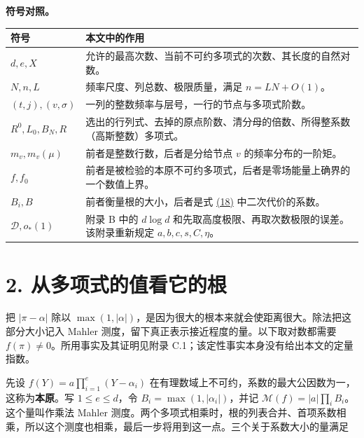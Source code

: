 \documentclass[11pt,a4paper]{article}
\newcounter{none}
\providecommand{\real}[1]{#1}
\begin{document}
\textbf{符号对照。}

{\def\LTcaptype{none} %
{\small
\begin{longtable}[]{@{}
  >{\raggedright\arraybackslash}p{(\linewidth - 2\tabcolsep) * \real{0.22}}
  >{\raggedright\arraybackslash}p{(\linewidth - 2\tabcolsep) * \real{0.78}}@{}}
\toprule\noalign{}
\begin{minipage}[b]{\linewidth}\raggedright
符号
\end{minipage} & \begin{minipage}[b]{\linewidth}\raggedright
本文中的作用
\end{minipage} \\
\midrule\noalign{}
\endhead
\bottomrule\noalign{}
\endlastfoot
\(d,e,X\) & 允许的最高次数、当前不可约多项式的次数、其长度的自然对数。 \\
\(N,n,L\) & 频率尺度、列总数、极限质量，满足 \(n=LN+O(1)\)。 \\
\((t,j),(v,\sigma)\) & 一列的整数频率与层号，一行的节点与多项式阶数。 \\
\(R^0,L_0,B_N,R\) & 选出的行列式、去掉的原点阶数、清分母的倍数、所得整系数（高斯整数）多项式。 \\
\(m_v,m_v(\mu)\) & 前者是整数行数，后者是分给节点 \(v\) 的频率分布的一阶矩。 \\
\(f,f_0\) & 前者是被检验的本原不可约多项式，后者是零场能量上确界的一个数值上界。 \\
\(B_i,B\) & 前者衡量根的大小，后者是式 \hyperref[eq:18]{(18)} 中二次代价的系数。 \\
\(\mathscr D,o_*(1)\) & 附录 B 中的 \(d\log d\) 和先取高度极限、再取次数极限的误差。该附录重新规定 \(a,b,c,s,C,\eta\)。 \\
\end{longtable}
}
}

\section{2. 从多项式的值看它的根}\label{ux4eceux591aux9879ux5f0fux7684ux503cux770bux5b83ux7684ux6839}

把 \(|\pi-\alpha|\) 除以 \(\max(1,|\alpha|)\)，是因为很大的根本来就会使距离很大。除法把这部分大小记入 Mahler 测度，留下真正表示接近程度的量。以下取对数都需要 \(f(\pi)\ne0\)。所用事实及其证明见附录 C.1；该定性事实本身没有给出本文的定量指数。

先设 \(f(Y)=a\prod_{i=1}^{e}(Y-\alpha_i)\) 在有理数域上不可约，系数的最大公因数为一，这称为\textbf{本原}。写 \(1\le e\le d\)，令 \(B_i=\max(1,|\alpha_i|)\)，并记 \(\mathcal M(f)=|a|\prod_iB_i\)。这个量叫作乘法 Mahler 测度。两个多项式相乘时，根的列表合并、首项系数相乘，所以这个测度也相乘，最后一步将用到这一点。三个关于系数大小的量满足
\end{document}
